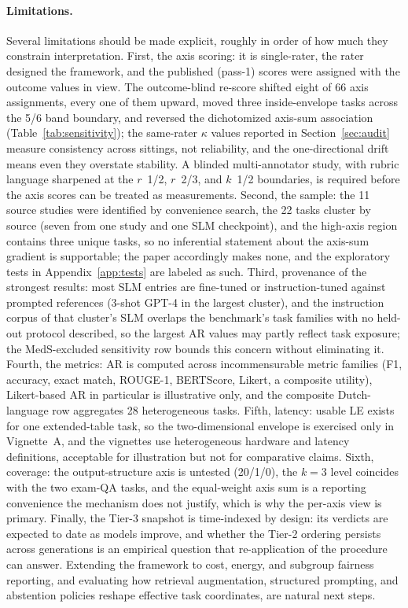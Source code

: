 \documentclass[11pt]{article}
\begin{document}
\paragraph{Limitations.}
Several limitations should be made explicit, roughly in order of how much they constrain interpretation. First, the axis scoring: it is single-rater, the rater designed the framework, and the published (pass-1) scores were assigned with the outcome values in view. The outcome-blind re-score shifted eight of 66 axis assignments, every one of them upward, moved three inside-envelope tasks across the 5/6 band boundary, and reversed the dichotomized axis-sum association (Table~\ref{tab:sensitivity}); the same-rater $\kappa$ values reported in Section~\ref{sec:audit} measure consistency across sittings, not reliability, and the one-directional drift means even they overstate stability. A blinded multi-annotator study, with rubric language sharpened at the $r$~1/2, $r$~2/3, and $k$~1/2 boundaries, is required before the axis scores can be treated as measurements. Second, the sample: the 11 source studies were identified by convenience search, the 22 tasks cluster by source (seven from one study and one SLM checkpoint), and the high-axis region contains three unique tasks, so no inferential statement about the axis-sum gradient is supportable; the paper accordingly makes none, and the exploratory tests in Appendix~\ref{app:tests} are labeled as such. Third, provenance of the strongest results: most SLM entries are fine-tuned or instruction-tuned against prompted references (3-shot GPT-4 in the largest cluster), and the instruction corpus of that cluster's SLM overlaps the benchmark's task families with no held-out protocol described, so the largest AR values may partly reflect task exposure; the MedS-excluded sensitivity row bounds this concern without eliminating it. Fourth, the metrics: AR is computed across incommensurable metric families (F1, accuracy, exact match, ROUGE-1, BERTScore, Likert, a composite utility), Likert-based AR in particular is illustrative only, and the composite Dutch-language row aggregates 28 heterogeneous tasks. Fifth, latency: usable LE exists for one extended-table task, so the two-dimensional envelope is exercised only in Vignette~A, and the vignettes use heterogeneous hardware and latency definitions, acceptable for illustration but not for comparative claims. Sixth, coverage: the output-structure axis is untested (20/1/0), the $k=3$ level coincides with the two exam-QA tasks, and the equal-weight axis sum is a reporting convenience the mechanism does not justify, which is why the per-axis view is primary. Finally, the Tier-3 snapshot is time-indexed by design: its verdicts are expected to date as models improve, and whether the Tier-2 ordering persists across generations is an empirical question that re-application of the procedure can answer. Extending the framework to cost, energy, and subgroup fairness reporting, and evaluating how retrieval augmentation, structured prompting, and abstention policies reshape effective task coordinates, are natural next steps.
\end{document}
